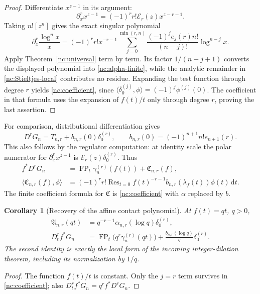 \documentclass[11pt,a4paper]{article}
\numberwithin{equation}{section}
\newtheorem{corollary}[theorem]{Corollary}
\theoremstyle{definition}
\theoremstyle{remark}
\DeclareMathOperator{\FP}{FP}
\DeclareMathOperator{\Res}{Res}
\newcommand{\dd}{\,\mathrm d}
\begin{document}
\begin{proof}
Differentiate $x^{z-1}$ in its argument:
\[
 \partial_x^rx^{z-1}
    =(-1)^rr!\mathcal E_r(z)x^{z-r-1}.
\]
Taking $n![z^n]$ gives the exact singular polynomial
\begin{equation}\label{nc:singular-polynomial}
 \partial_x^r\frac{\log^n x}{x}
  =(-1)^rr!x^{-r-1}
      \sum_{j=0}^{\min(r,n)}
       \frac{(-1)^je_j(r)n!}{(n-j)!}\log^{n-j}x.
\end{equation}
Apply Theorem~\ref{nc:universal} term by term. Its factor
$1/(n-j+1)$ converts the displayed polynomial into
\eqref{nc:alpha-finite}, while the analytic remainder in
\eqref{nc:Stieltjes-local} contributes no residue. Expanding the test
function through degree $r$ yields \eqref{nc:coefficient}, since
$\langle\delta_0^{(j)},\phi\rangle=(-1)^j\phi^{(j)}(0)$.
The coefficient in that formula uses the expansion of $f(t)/t$ only
through degree $r$, proving the last assertion.
\end{proof}

For comparison, distributional differentiation gives
\begin{equation}\label{nc:derivative-contact}
 D^rG_n=T_{n,r}+b_{n,r}(0)\delta_0^{(r)},\qquad
 b_{n,r}(0)=(-1)^{n+1}n!e_{n+1}(r).
\end{equation}
This also follows by the regulator computation: at identity scale the
polar numerator for $\partial_x^rx^{z-1}$ is
$\mathcal E_r(z)\delta_0^{(r)}$. Thus
\begin{align}
 f^*D^rG_n&=\FP_t\gamma_n^{(r)}(f(t))+\mathfrak C_{n,r}(f),
       \label{nc:distributional-law}\\
 \langle\mathfrak C_{n,r}(f),\phi\rangle
   &=(-1)^rr!\Res_{t=0}
       f(t)^{-r-1}b_{n,r}(\lambda_f(t))\phi(t)\dd t.
       \label{nc:Cresidue}
\end{align}
The finite coefficient formula for $\mathfrak C$ is
\eqref{nc:coefficient} with $\alpha$ replaced by $b$.

\begin{corollary}[Recovery of the affine contact polynomial]
\label{nc:affine}
At $f(t)=qt$, $q>0$,
\begin{align}
 \mathfrak A_{n,r}(qt)&=q^{-r-1}\alpha_{n,r}(\log q)
                         \delta_0^{(r)},\label{nc:affine-A}\\
 D_t^r f^*G_n
   &=\FP_t\bigl(q^r\gamma_n^{(r)}(qt)\bigr)
        +\frac{b_{n,r}(\log q)}q\delta_0^{(r)}.
       \label{nc:affine-C}
\end{align}
The second identity is exactly the local form of the incoming
integer-dilation theorem, including its normalization by $1/q$.
\end{corollary}
\begin{proof}
The function $f(t)/t$ is constant. Only the $j=r$ term survives in
\eqref{nc:coefficient}; also
$D_t^rf^*G_n=q^rf^*D^rG_n$.
\end{proof}
\end{document}

